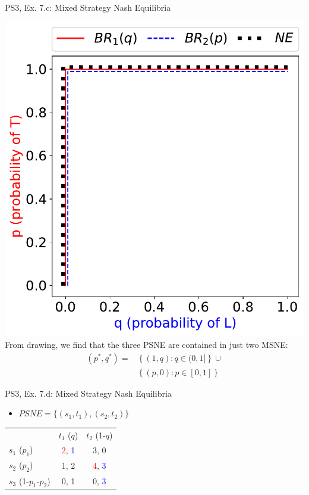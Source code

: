 \begin{frame}{PS3, Ex. 7.c: Mixed Strategy Nash Equilibria}
\begin{multicols}{2}
    \includegraphics[width=\columnwidth]{figures/5c2}
    From drawing, we find that the three PSNE are contained in just two MSNE:
    \begin{align*}
      (p^{*},q^{*})=&\left\{(1,q):q\in(0,1]\right\}\cup\\
                    &\left\{(p,0):p\in[0,1]\right\}
    \end{align*}
  \vfill\null
  \end{multicols}
\end{frame}
\begin{frame}{PS3, Ex. 7.d: Mixed Strategy Nash Equilibria}
  \begin{multicols}{2}
    \begin{itemize}
      \item[(d)] $PSNE=\{(s_1,t_1),(s_2,t_2)\}$
    \end{itemize}
    \begin{table}
      \begin{tabular}{l|c|c|}
          \multicolumn{1}{c}{}  & \multicolumn{1}{c}{$t_1$ ($q$)} & \multicolumn{1}{c}{$t_2$ (1-$q$)} \\\cline{2-3}
          $s_1$ ($p_1$)         & \textcolor{red}{2}, \textcolor{blue}{1} & 3, 0 \\\cline{2-3}
          $s_2$ ($p_2$)         & 1, 2 & \textcolor{red}{4}, \textcolor{blue}{3} \\\cline{2-3}
          $s_3$ (1-$p_1$-$p_2$) & 0, 1 & 0, \textcolor{blue}{3} \\\cline{2-3}
      \end{tabular}
    \end{table}
  \vfill\null \columnbreak
  \vfill\null
  \end{multicols}
\end{frame}
